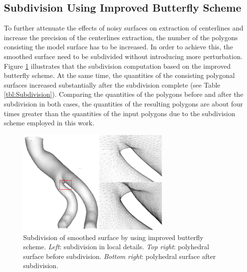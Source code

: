 \subsection{Subdivision Using Improved Butterfly Scheme}

To further attenuate the effects of noisy surfaces on extraction of centerlines and increase the precision of the centerlines extraction, the number of the polygons consisting the model surface has to be increased.
In order to achieve this, the smoothed surface need to be subdivided without introducing more perturbation.
Figure \ref{fig:SubdivisionLocal} illustrates that the subdivision computation based on the improved butterfly scheme.
At the same time, the quantities of the consisting polygonal surfaces increased substantially after the subdivision complete (see Table \ref{tbl:Subdivision}).
Comparing the quantities of the polygons before and after the subdivision in both cases, the quantities of the resulting polygons are about four times greater than the quantities of the input polygons due to the subdivision scheme employed in this work.
\begin{figure}[t]
\centering
\includegraphics[width=3.0in]{Figures/subdivision.png}
\caption{Subdivision of smoothed surface by using improved butterfly scheme. \emph{Left}: subdivision in local details. \emph{Top right}: polyhedral surface before subdivision. \emph{Bottom right}: polyhedral surface after subdivision.}%
\label{fig:SubdivisionLocal}
\end{figure}

